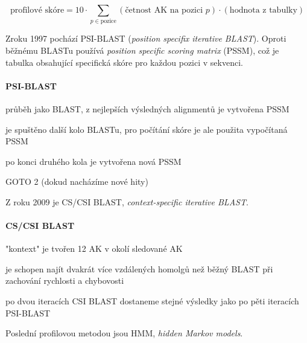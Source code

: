 \documentclass[DIV=8]{scrreprt}
\begin{document}
\[\text{profilové skóre} = 10 \cdot \sum_{p \in \text{pozice}} (\text{četnost AK na pozici } p) \cdot (\text{hodnota z tabulky})\]

Zroku 1997 pochází PSI-BLAST (\emph{position specifix iterative BLAST}). Oproti běžnému BLASTu používá \emph{position specific scoring matrix} (PSSM), což je tabulka obsahující specifická skóre pro každou pozici v sekvenci.

\paragraph{PSI-BLAST}
\begin{myEnumerate}[nosep]
    \item průběh jako BLAST, z nejlepších výsledných alignmentů je vytvořena PSSM
    \item je spuštěno další kolo BLASTu, pro počítání skóre je ale použita vypočítaná PSSM
\begin{myItemize}[nosep]
    \item po konci druhého kola je vytvořena nová PSSM
\end{myItemize}

    \item GOTO 2 (dokud nacházíme nové hity)
\end{myEnumerate}



Z roku 2009 je CS/CSI BLAST, \emph{context-specific iterative BLAST}.

\paragraph{CS/CSI BLAST}
\begin{myItemize}[nosep]
    \item "kontext" je tvořen 12 AK v okolí sledované AK
    \item je schopen najít dvakrát více vzdálených homolgů než běžný BLAST při zachování rychlosti a chybovosti
    \item po dvou iteracích CSI BLAST dostaneme stejné výsledky jako po pěti iteracích PSI-BLAST
\end{myItemize}



Poslední profilovou metodou jsou HMM, \emph{hidden Markov models}.
\end{document}

